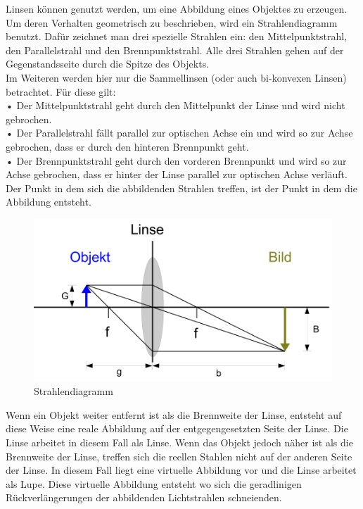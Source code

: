 \documentclass[a4paper]{scrartcl}
\numberwithin{equation}{subsection}
\begin{document}
Linsen können genutzt werden, um eine Abbildung eines Objektes zu erzeugen. Um deren Verhalten geometrisch zu beschrieben, wird ein Strahlendiagramm benutzt. Dafür zeichnet man drei spezielle Strahlen ein: den Mittelpunktstrahl, den Parallelstrahl und den Brennpunktstrahl. Alle drei Strahlen gehen auf der Gegenstandsseite durch die Spitze des Objekts.\\

Im Weiteren werden hier nur die Sammellinsen (oder auch bi-konvexen Linsen) betrachtet. \cite{anl}
Für diese gilt:\\
• Der Mittelpunktstrahl geht durch den Mittelpunkt der Linse und wird nicht gebrochen. \\
• Der Parallelstrahl fällt parallel zur optischen Achse ein und wird so zur Achse gebrochen, dass er durch den hinteren Brennpunkt geht. \\
• Der Brennpunktstrahl geht durch den vorderen Brennpunkt und wird so zur Achse gebrochen, dass er hinter der Linse parallel zur optischen Achse verläuft. \\

Der Punkt in dem sich die abbildenden Strahlen treffen, ist der Punkt in dem die Abbildung entsteht.\\

\begin{figure}[H]
\includegraphics[width=12cm]{Abbildungen/strahlendiagramm}
\centering
\caption{Strahlendiagramm \cite{anl}}
\centering
\label{fig:strahlendiagramm}
\end{figure}

Wenn ein Objekt weiter entfernt ist als die Brennweite der Linse, entsteht auf diese Weise eine reale Abbildung auf der entgegengesetzten Seite der Linse. Die Linse arbeitet in diesem Fall als Linse. Wenn das Objekt jedoch näher ist als die Brennweite der Linse, treffen sich die reellen Stahlen nicht auf der anderen Seite der Linse. In diesem Fall liegt eine virtuelle Abbildung vor und die Linse arbeitet als Lupe. Diese virtuelle Abbildung entsteht wo sich die geradlinigen Rückverlängerungen der abbildenden Lichtstrahlen schneienden.\\
\end{document}
